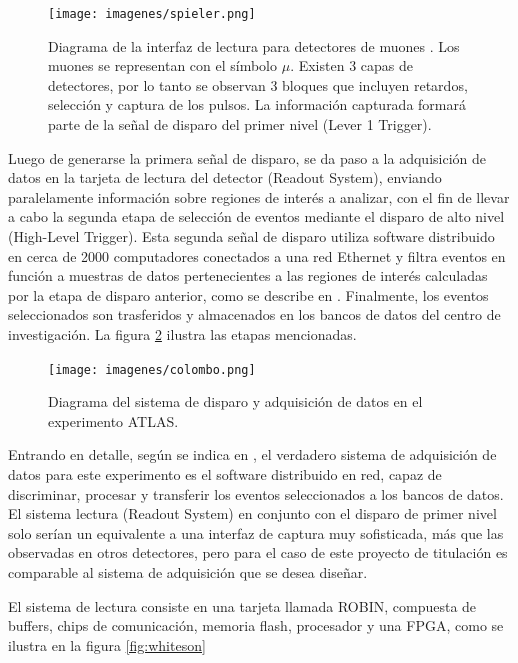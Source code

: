 \begin{figure}[H]
	\centering
	\texttt{[image: imagenes/spieler.png]}
	\caption{Diagrama de la interfaz de lectura para detectores de muones \cite{Spieler2012ElectronicsAcquisition}. Los muones se representan con el símbolo $\mu$. Existen 3 capas de detectores, por lo tanto se observan 3 bloques que incluyen retardos, selección y captura de los pulsos. La información capturada formará parte de la señal de disparo del primer nivel (Lever 1 Trigger).}
	\label{fig:spieler}
\end{figure}

\par Luego de generarse la primera señal de disparo, se da paso a la adquisición de datos en la tarjeta de lectura del detector (Readout System), enviando paralelamente información sobre regiones de interés a analizar, con el fin de llevar a cabo la segunda etapa de selección de eventos mediante el disparo de alto nivel (High-Level Trigger). Esta segunda señal de disparo utiliza software distribuido en cerca de 2000 computadores conectados a una red Ethernet y filtra eventos en función a muestras de datos pertenecientes a las regiones de interés calculadas por la etapa de disparo anterior, como se describe en \cite{Colombo2015Data-flowCase}. Finalmente, los eventos seleccionados son trasferidos y  almacenados en los bancos de datos del centro de investigación. La figura \ref{fig:colombo} ilustra las etapas mencionadas.

\begin{figure}[H]
	\centering
	\texttt{[image: imagenes/colombo.png]}
	\caption{Diagrama del sistema de disparo y adquisición de datos en el experimento ATLAS. \cite{Colombo2015Data-flowCase}}
	\label{fig:colombo}
\end{figure}

\par Entrando en detalle, según se indica en \cite{Whiteson2016TheSystem}, el verdadero sistema de adquisición de datos para este experimento es el software distribuido en red, capaz de discriminar, procesar y transferir los eventos seleccionados a los bancos de datos. El sistema lectura (Readout System) en conjunto con el disparo de primer nivel solo serían un equivalente a una interfaz de captura muy sofisticada, más que las observadas en otros detectores, pero para el caso de este proyecto de titulación es comparable al sistema de adquisición que se desea diseñar.

\par El sistema de lectura consiste en una tarjeta llamada ROBIN, compuesta de buffers, chips de comunicación, memoria flash, procesador y una FPGA, como se ilustra en la figura \ref{fig:whiteson}

